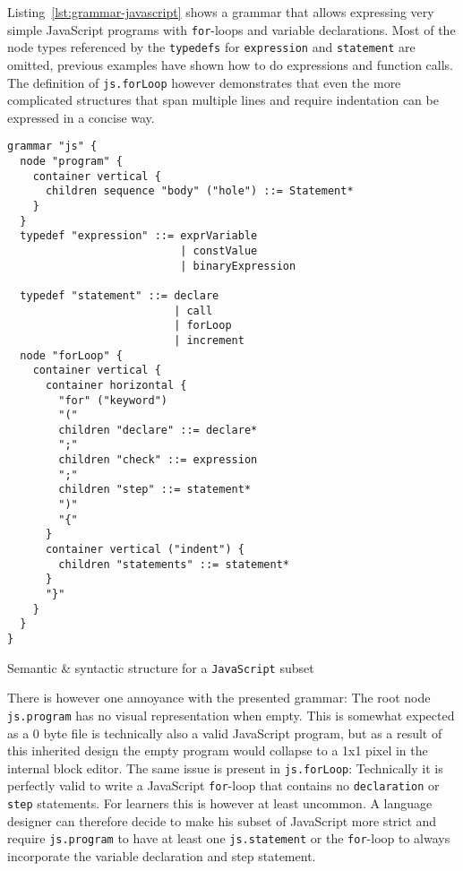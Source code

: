 \documentclass[sigconf,natbib=false,review=true,anonymous]{acmart}
\newenvironment{longlisting}{\captionsetup{type=listing} \vspace{1.5em}}{\vspace{1.5em}}
\begin{document}
Listing~\ref{lst:grammar-javascript} shows a grammar that allows expressing very simple JavaScript programs with \texttt{for}-loops and variable declarations. Most of the node types referenced by the \texttt{typedefs} for \texttt{expression} and \texttt{statement} are omitted, previous examples have shown how to do expressions and function calls. The definition of \texttt{js.forLoop} however demonstrates that even the more complicated structures that span multiple lines and require indentation can be expressed in a concise way.

\begin{longlisting}
\begin{verbatim}
grammar "js" {
  node "program" {
    container vertical {
      children sequence "body" ("hole") ::= Statement*
    }
  }
  typedef "expression" ::= exprVariable
                           | constValue
                           | binaryExpression

  typedef "statement" ::= declare
                          | call
                          | forLoop
                          | increment
  node "forLoop" {
    container vertical {
      container horizontal {
        "for" ("keyword")
        "("
        children "declare" ::= declare*
        ";"
        children "check" ::= expression
        ";"
        children "step" ::= statement*
        ")"
        "{"
      }
      container vertical ("indent") {
        children "statements" ::= statement*
      }
      "}"
    }
  }
}
\end{verbatim}
\caption{Semantic \& syntactic structure for a \texttt{JavaScript} subset}
\label{lst:grammar-javascript}
\end{longlisting}

There is however one annoyance with the presented grammar: The root node \texttt{js.program} has no visual representation when empty. This is somewhat expected as a 0 byte file is technically also a valid JavaScript program, but as a result of this inherited design the empty program would collapse to a 1x1 pixel in the internal block editor. The same issue is present in \texttt{js.forLoop}: Technically it is perfectly valid to write a JavaScript \texttt{for}-loop that contains no \texttt{declaration} or \texttt{step} statements. For learners this is however at least uncommon. A language designer can therefore decide to make his subset of JavaScript more strict and require \texttt{js.program} to have at least one \texttt{js.statement} or the \texttt{for}-loop to always incorporate the variable declaration and step statement.
\end{document}
